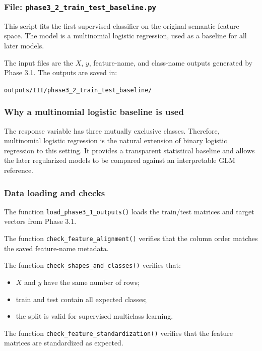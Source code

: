 \documentclass{ipgpmaster}
\begin{document}
\subsubsection{File: \texttt{phase3\_2\_train\_test\_baseline.py}}

This script fits the first supervised classifier on the original semantic feature space. The model is a multinomial logistic regression, used as a baseline for all later models.

The input files are the \(X\), \(y\), feature-name, and class-name outputs generated by Phase 3.1. The outputs are saved in:

\begin{center}
\texttt{outputs/III/phase3\_2\_train\_test\_baseline/}
\end{center}

\subsubsection{Why a multinomial logistic baseline is used}

The response variable has three mutually exclusive classes. Therefore, multinomial logistic regression is the natural extension of binary logistic regression to this setting. It provides a transparent statistical baseline and allows the later regularized models to be compared against an interpretable GLM reference.

\subsubsection{Data loading and checks}

The function \texttt{load\_phase3\_1\_outputs()} loads the train/test matrices and target vectors from Phase 3.1.

The function \texttt{check\_feature\_alignment()} verifies that the column order matches the saved feature-name metadata.

The function \texttt{check\_shapes\_and\_classes()} verifies that:

\begin{itemize}
    \item \(X\) and \(y\) have the same number of rows;
    \item train and test contain all expected classes;
    \item the split is valid for supervised multiclass learning.
\end{itemize}

The function \texttt{check\_feature\_standardization()} verifies that the feature matrices are standardized as expected.
\end{document}
